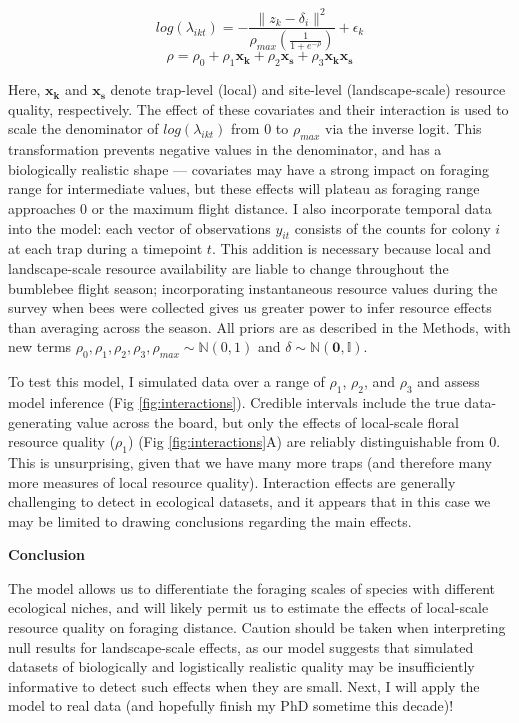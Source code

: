 \documentclass[11pt]{article}
\begin{document}
\[
log(\lambda_{ikt}) = -\frac{\lVert z_k - \delta_i \rVert^2}{\rho_{max} (\frac{1}{1+e^{-\rho}})} + \epsilon_k
\]
\[
\rho = \rho_0 + \rho_1 \mathbf{x_k} + \rho_2 \mathbf{x_s} + \rho_3 \mathbf{x_k x_s}
\]

\noindent Here, $\mathbf{x_k}$ and $\mathbf{x_s}$ denote trap-level (local) and site-level (landscape-scale) resource quality, respectively. The effect of these covariates and their interaction is used to scale the denominator of $log(\lambda_{ikt})$ from 0 to $\rho_{max}$ via the inverse logit. This transformation prevents negative values in the denominator, and has a biologically realistic shape --- covariates may have a strong impact on foraging range for intermediate values, but these effects will plateau as foraging range approaches 0 or the maximum flight distance. I also incorporate temporal data into the model: each vector of observations $y_{it}$ consists of the counts for colony $i$ at each trap during a timepoint $t$. This addition is necessary because local and landscape-scale resource availability are liable to change throughout the bumblebee flight season; incorporating instantaneous resource values during the survey when bees were collected gives us greater power to infer resource effects than averaging across the season. All priors are as described in the Methods, with new terms $\rho_0, \rho_1, \rho_2, \rho_3, \rho_{max} \sim \mathbb{N}(0,1)$ and $\delta \sim \mathbb{N}(\mathbf{0},\mathbb{I})$.

To test this model, I simulated data over a range of $\rho_1$, $\rho_2$, and $\rho_3$ and assess model inference (Fig \ref{fig:interactions}). Credible intervals include the true data-generating value across the board, but only the effects of local-scale floral resource quality ($\rho_1$) (Fig \ref{fig:interactions}A) are reliably distinguishable from 0. This is unsurprising, given that we have many more traps (and therefore many more measures of local resource quality). Interaction effects are generally challenging to detect in ecological datasets, and it appears that in this case we may be limited to drawing conclusions regarding the main effects.

\textbf{Conclusion}

The model allows us to differentiate the foraging scales of species with different ecological niches, and will likely permit us to estimate the effects of local-scale resource quality on foraging distance. Caution should be taken when interpreting null results for landscape-scale effects, as our model suggests that simulated datasets of biologically and logistically realistic quality may be insufficiently informative to detect such effects when they are small. Next, I will apply the model to real data (and hopefully finish my PhD sometime this decade)!
\end{document}
